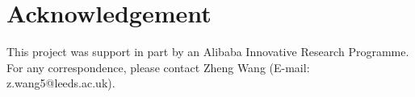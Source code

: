 \vspace{-4mm}
\section*{Acknowledgement}
\vspace{-3mm} This project was support in part by an Alibaba Innovative Research Programme.
 For any correspondence, please contact Zheng Wang (E-mail:
z.wang5@leeds.ac.uk).
